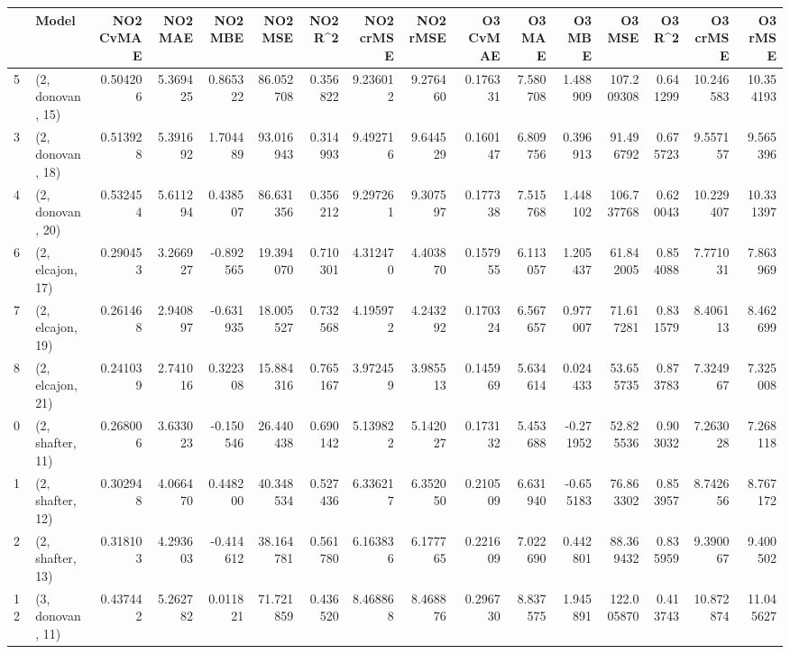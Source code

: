 \begin{tabular}{llrrrrrrrrrrrrrr}
\toprule
{} &             Model &  NO2 CvMAE &   NO2 MAE &   NO2 MBE &    NO2 MSE &   NO2 R\textasciicircum2 &  NO2 crMSE &  NO2 rMSE &  O3 CvMAE &    O3 MAE &    O3 MBE &      O3 MSE &    O3 R\textasciicircum2 &   O3 crMSE &    O3 rMSE \\
\midrule
5  &  (2, donovan, 15) &   0.504206 &  5.369425 &  0.865322 &  86.052708 &  0.356822 &   9.236012 &  9.276460 &  0.176331 &  7.580708 &  1.488909 &  107.209308 &  0.641299 &  10.246583 &  10.354193 \\
3  &  (2, donovan, 18) &   0.513928 &  5.391692 &  1.704489 &  93.016943 &  0.314993 &   9.492716 &  9.644529 &  0.160147 &  6.809756 &  0.396913 &   91.496792 &  0.675723 &   9.557157 &   9.565396 \\
4  &  (2, donovan, 20) &   0.532454 &  5.611294 &  0.438507 &  86.631356 &  0.356212 &   9.297261 &  9.307597 &  0.177338 &  7.515768 &  1.448102 &  106.737768 &  0.620043 &  10.229407 &  10.331397 \\
6  &  (2, elcajon, 17) &   0.290453 &  3.266927 & -0.892565 &  19.394070 &  0.710301 &   4.312470 &  4.403870 &  0.157955 &  6.113057 &  1.205437 &   61.842005 &  0.854088 &   7.771031 &   7.863969 \\
7  &  (2, elcajon, 19) &   0.261468 &  2.940897 & -0.631935 &  18.005527 &  0.732568 &   4.195972 &  4.243292 &  0.170324 &  6.567657 &  0.977007 &   71.617281 &  0.831579 &   8.406113 &   8.462699 \\
8  &  (2, elcajon, 21) &   0.241039 &  2.741016 &  0.322308 &  15.884316 &  0.765167 &   3.972459 &  3.985513 &  0.145969 &  5.634614 &  0.024433 &   53.655735 &  0.873783 &   7.324967 &   7.325008 \\
0  &  (2, shafter, 11) &   0.268006 &  3.633023 & -0.150546 &  26.440438 &  0.690142 &   5.139822 &  5.142027 &  0.173132 &  5.453688 & -0.271952 &   52.825536 &  0.903032 &   7.263028 &   7.268118 \\
1  &  (2, shafter, 12) &   0.302948 &  4.066470 &  0.448200 &  40.348534 &  0.527436 &   6.336217 &  6.352050 &  0.210509 &  6.631940 & -0.655183 &   76.863302 &  0.853957 &   8.742656 &   8.767172 \\
2  &  (2, shafter, 13) &   0.318103 &  4.293603 & -0.414612 &  38.164781 &  0.561780 &   6.163836 &  6.177765 &  0.221609 &  7.022690 &  0.442801 &   88.369432 &  0.835959 &   9.390067 &   9.400502 \\
12 &  (3, donovan, 11) &   0.437442 &  5.262782 &  0.011821 &  71.721859 &  0.436520 &   8.468868 &  8.468876 &  0.296730 &  8.837575 &  1.945891 &  122.005870 &  0.413743 &  10.872874 &  11.045627 \\

\end{tabular}
